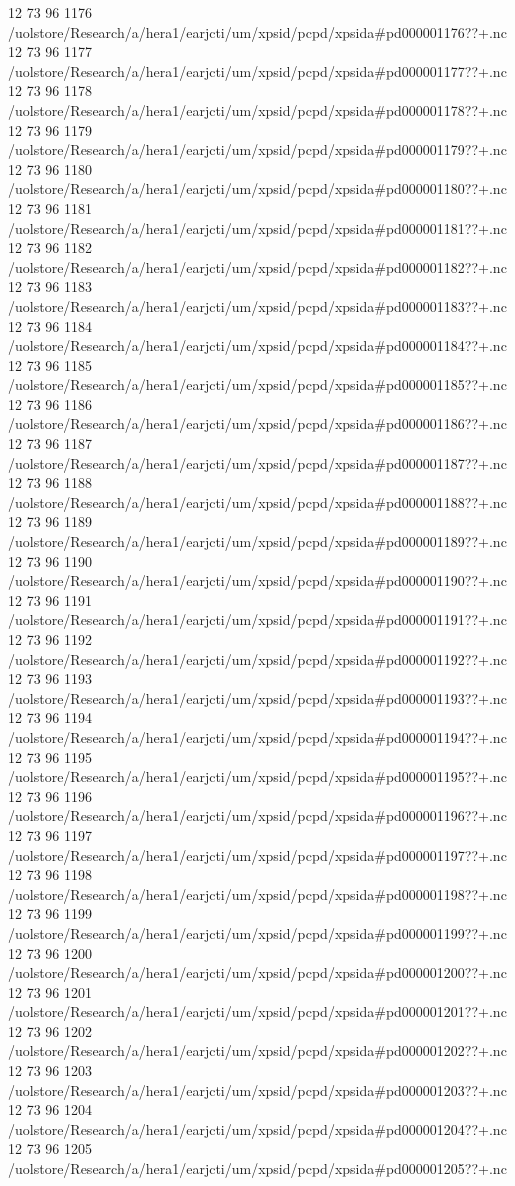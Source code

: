 12 73 96
1176
/uolstore/Research/a/hera1/earjcti/um/xpsid/pcpd/xpsida#pd000001176??+.nc
12 73 96
1177
/uolstore/Research/a/hera1/earjcti/um/xpsid/pcpd/xpsida#pd000001177??+.nc
12 73 96
1178
/uolstore/Research/a/hera1/earjcti/um/xpsid/pcpd/xpsida#pd000001178??+.nc
12 73 96
1179
/uolstore/Research/a/hera1/earjcti/um/xpsid/pcpd/xpsida#pd000001179??+.nc
12 73 96
1180
/uolstore/Research/a/hera1/earjcti/um/xpsid/pcpd/xpsida#pd000001180??+.nc
12 73 96
1181
/uolstore/Research/a/hera1/earjcti/um/xpsid/pcpd/xpsida#pd000001181??+.nc
12 73 96
1182
/uolstore/Research/a/hera1/earjcti/um/xpsid/pcpd/xpsida#pd000001182??+.nc
12 73 96
1183
/uolstore/Research/a/hera1/earjcti/um/xpsid/pcpd/xpsida#pd000001183??+.nc
12 73 96
1184
/uolstore/Research/a/hera1/earjcti/um/xpsid/pcpd/xpsida#pd000001184??+.nc
12 73 96
1185
/uolstore/Research/a/hera1/earjcti/um/xpsid/pcpd/xpsida#pd000001185??+.nc
12 73 96
1186
/uolstore/Research/a/hera1/earjcti/um/xpsid/pcpd/xpsida#pd000001186??+.nc
12 73 96
1187
/uolstore/Research/a/hera1/earjcti/um/xpsid/pcpd/xpsida#pd000001187??+.nc
12 73 96
1188
/uolstore/Research/a/hera1/earjcti/um/xpsid/pcpd/xpsida#pd000001188??+.nc
12 73 96
1189
/uolstore/Research/a/hera1/earjcti/um/xpsid/pcpd/xpsida#pd000001189??+.nc
12 73 96
1190
/uolstore/Research/a/hera1/earjcti/um/xpsid/pcpd/xpsida#pd000001190??+.nc
12 73 96
1191
/uolstore/Research/a/hera1/earjcti/um/xpsid/pcpd/xpsida#pd000001191??+.nc
12 73 96
1192
/uolstore/Research/a/hera1/earjcti/um/xpsid/pcpd/xpsida#pd000001192??+.nc
12 73 96
1193
/uolstore/Research/a/hera1/earjcti/um/xpsid/pcpd/xpsida#pd000001193??+.nc
12 73 96
1194
/uolstore/Research/a/hera1/earjcti/um/xpsid/pcpd/xpsida#pd000001194??+.nc
12 73 96
1195
/uolstore/Research/a/hera1/earjcti/um/xpsid/pcpd/xpsida#pd000001195??+.nc
12 73 96
1196
/uolstore/Research/a/hera1/earjcti/um/xpsid/pcpd/xpsida#pd000001196??+.nc
12 73 96
1197
/uolstore/Research/a/hera1/earjcti/um/xpsid/pcpd/xpsida#pd000001197??+.nc
12 73 96
1198
/uolstore/Research/a/hera1/earjcti/um/xpsid/pcpd/xpsida#pd000001198??+.nc
12 73 96
1199
/uolstore/Research/a/hera1/earjcti/um/xpsid/pcpd/xpsida#pd000001199??+.nc
12 73 96
1200
/uolstore/Research/a/hera1/earjcti/um/xpsid/pcpd/xpsida#pd000001200??+.nc
12 73 96
1201
/uolstore/Research/a/hera1/earjcti/um/xpsid/pcpd/xpsida#pd000001201??+.nc
12 73 96
1202
/uolstore/Research/a/hera1/earjcti/um/xpsid/pcpd/xpsida#pd000001202??+.nc
12 73 96
1203
/uolstore/Research/a/hera1/earjcti/um/xpsid/pcpd/xpsida#pd000001203??+.nc
12 73 96
1204
/uolstore/Research/a/hera1/earjcti/um/xpsid/pcpd/xpsida#pd000001204??+.nc
12 73 96
1205
/uolstore/Research/a/hera1/earjcti/um/xpsid/pcpd/xpsida#pd000001205??+.nc
